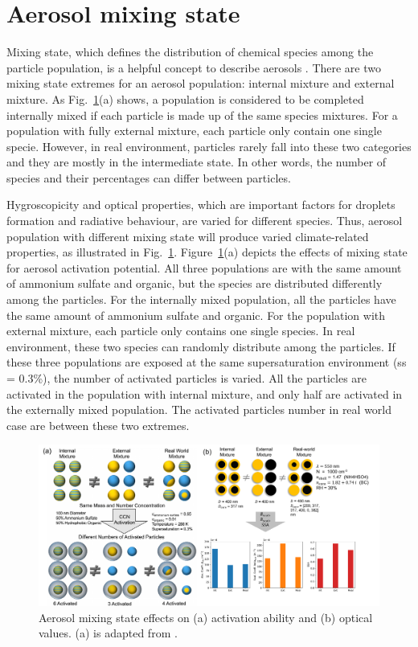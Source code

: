 \documentclass[edeposit,fullpage]{uiucthesis2009}
\begin{document}
\section{Aerosol mixing state}
Mixing state, which defines the distribution of chemical species among the particle population, is a helpful concept to describe aerosols \citep{winkler1973growth}. There are two mixing state extremes for an aerosol population: internal mixture and external mixture. As Fig.~\ref{fig:chap1-chi-climate}(a) shows, a population is considered to be completed internally mixed if each particle is made up of the same species mixtures. For a population with fully external mixture, each particle only contain one single specie. However, in real environment, particles rarely fall into these two categories and they are mostly in the intermediate state. In other words, the number of species and their percentages can differ between particles.

Hygroscopicity and optical properties, which are important factors for droplets formation and radiative behaviour, are varied for different species. Thus, aerosol population with different mixing state will produce varied climate-related properties, as illustrated in Fig.~\ref{fig:chap1-chi-climate}. Figure~\ref{fig:chap1-chi-climate}(a) depicts the effects of mixing state for aerosol activation potential. All three populations are with the same amount of ammonium sulfate and organic, but the species are distributed differently among the particles. For the internally mixed population, all the particles have the same amount of ammonium sulfate and organic. For the population with external mixture, each particle only contains one single species. In real environment, these two species can randomly distribute among the particles. If these three populations are exposed at the same supersaturation environment (ss = 0.3\%), the number of activated particles is varied. All the particles are activated in the population with internal mixture, and only half are activated in the externally mixed population. The activated particles number in real world case are between these two extremes. 

\begin{figure}
	\centering
	\includegraphics[scale=0.60]{chap1_figs/thesis_chap1_fig3.pdf}
	\caption{Aerosol mixing state effects on (a) activation ability and (b) optical values. (a) is adapted from \cite{Riemer2019}.}
	\label{fig:chap1-chi-climate}
\end{figure}
\end{document}
